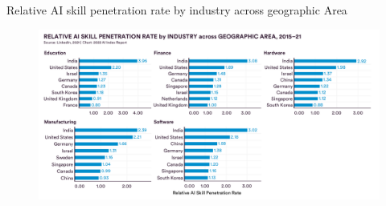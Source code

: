 %
%
%
%

%
%
%
%

{

\begin{frame}{
Relative AI skill penetration rate by industry across geographic Area
}

\begin{figure}
 \centering
 \includegraphics[width=1.0\textwidth]{./figures/progress-of-air-e/outputs/drawing-v00.png}
\end{figure}

\end{frame}
}



